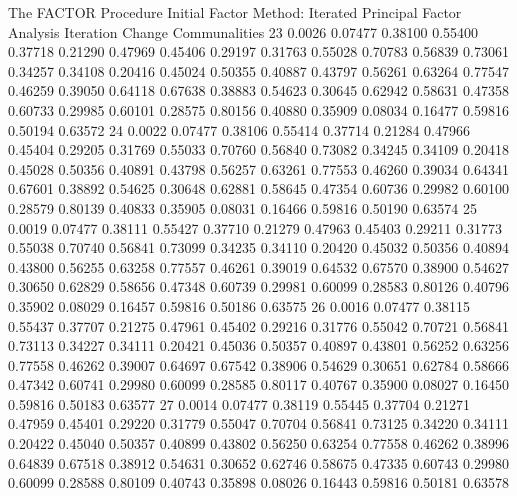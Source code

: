 \documentclass{article}
\begin{document}
\begin{Woutput}
The FACTOR Procedure
Initial Factor Method: Iterated Principal Factor Analysis
Iteration  Change                                   Communalities
   23      0.0026  0.07477  0.38100  0.55400  0.37718  0.21290  0.47969  0.45406  0.29197  0.31763
                   0.55028  0.70783  0.56839  0.73061  0.34257  0.34108  0.20416  0.45024  0.50355
                   0.40887  0.43797  0.56261  0.63264  0.77547  0.46259  0.39050  0.64118  0.67638
                   0.38883  0.54623  0.30645  0.62942  0.58631  0.47358  0.60733  0.29985  0.60101
                   0.28575  0.80156  0.40880  0.35909  0.08034  0.16477  0.59816  0.50194  0.63572
   24      0.0022  0.07477  0.38106  0.55414  0.37714  0.21284  0.47966  0.45404  0.29205  0.31769
                   0.55033  0.70760  0.56840  0.73082  0.34245  0.34109  0.20418  0.45028  0.50356
                   0.40891  0.43798  0.56257  0.63261  0.77553  0.46260  0.39034  0.64341  0.67601
                   0.38892  0.54625  0.30648  0.62881  0.58645  0.47354  0.60736  0.29982  0.60100
                   0.28579  0.80139  0.40833  0.35905  0.08031  0.16466  0.59816  0.50190  0.63574
   25      0.0019  0.07477  0.38111  0.55427  0.37710  0.21279  0.47963  0.45403  0.29211  0.31773
                   0.55038  0.70740  0.56841  0.73099  0.34235  0.34110  0.20420  0.45032  0.50356
                   0.40894  0.43800  0.56255  0.63258  0.77557  0.46261  0.39019  0.64532  0.67570
                   0.38900  0.54627  0.30650  0.62829  0.58656  0.47348  0.60739  0.29981  0.60099
                   0.28583  0.80126  0.40796  0.35902  0.08029  0.16457  0.59816  0.50186  0.63575
   26      0.0016  0.07477  0.38115  0.55437  0.37707  0.21275  0.47961  0.45402  0.29216  0.31776
                   0.55042  0.70721  0.56841  0.73113  0.34227  0.34111  0.20421  0.45036  0.50357
                   0.40897  0.43801  0.56252  0.63256  0.77558  0.46262  0.39007  0.64697  0.67542
                   0.38906  0.54629  0.30651  0.62784  0.58666  0.47342  0.60741  0.29980  0.60099
                   0.28585  0.80117  0.40767  0.35900  0.08027  0.16450  0.59816  0.50183  0.63577
   27      0.0014  0.07477  0.38119  0.55445  0.37704  0.21271  0.47959  0.45401  0.29220  0.31779
                   0.55047  0.70704  0.56841  0.73125  0.34220  0.34111  0.20422  0.45040  0.50357
                   0.40899  0.43802  0.56250  0.63254  0.77558  0.46262  0.38996  0.64839  0.67518
                   0.38912  0.54631  0.30652  0.62746  0.58675  0.47335  0.60743  0.29980  0.60099
                   0.28588  0.80109  0.40743  0.35898  0.08026  0.16443  0.59816  0.50181  0.63578

\end{Woutput}
\end{document}
